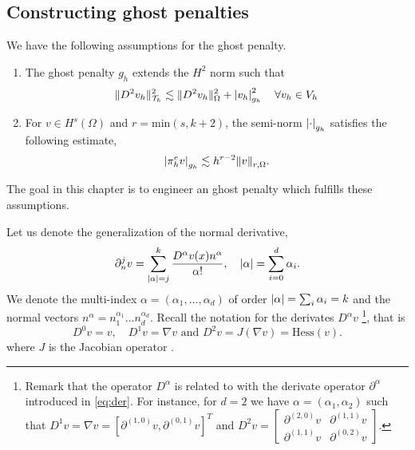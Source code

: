 
\subsection{Constructing ghost penalties}%
\label{sec:constructing_ghost_penalties}

We have the following assumptions for the ghost penalty.
\begin{enumerate}[label=\textbf{EP\arabic*}]
    \item \label{as:EP1} The ghost penalty $g_{h}$ extends the $H^{2}$ norm such that
        \begin{equation}
    \| D^2v_{h} \|_{ \mathcal{T} _{h} }^{ 2 }  \lesssim \| D^2 v_{h} \|_{ \Omega  }^{  2} + \left\lvert  v_{h}  \right\rvert _{g_{h}}^2 \quad \forall v_{h} \in V_{h}
        \end{equation}
\item \label{as:EP2} For $v \in H^{s}( \Omega ) $ and $r = \mathrm{ min} (s,k+2) $, the semi-norm $\left\lvert  \cdot   \right\rvert_{g_{h}} $ satisfies the following estimate, \[
    \left\lvert  \pi _{h}^{e} v  \right\rvert _{g_{h}} \lesssim  h^{r-2} \| v \|_{ r,\Omega  }^{  }.
    \]
\end{enumerate}
The goal in this chapter is to engineer an ghost penalty which fulfills these assumptions.

Let us denote the generalization of the normal derivative,
\begin{equation}
\partial _{n}^{j} v = \sum_{\left\lvert  \alpha   \right\rvert =j }^{k} \frac{D ^{\alpha }v( x) n^{\alpha }}{\alpha !}, \quad \left\lvert  \alpha   \right\rvert = \sum_{i=0}^{d} \alpha_{i}.
\end{equation}
We denote the multi-index $\alpha  = ( \alpha _{1}, \ldots, \alpha _{d})  $ of order $\left\lvert  \alpha   \right\rvert = \sum_{i}^{}  \alpha _{i} = k $   and the normal vectors $n^{\alpha } = n_{1}^{\alpha _{1}} \ldots n_{d}^{\alpha _{d}}$.
Recall the notation for the derivates $D^{\alpha } v$
\footnote{
Remark that the operator $D^{\alpha }$  is related to with the derivate operator $\partial ^{\alpha } $ introduced in \eqref{eq:der}. For instance, for $d=2$ we have $\alpha = ( \alpha _{1}, \alpha _{2}) $  such that $ D^{1} v =  \nabla v  = \left[ \partial ^{( 1,0 )} v,\partial ^{( 0,1 )}v
\right]^{T}$ and $   D^2 v  = \begin{bmatrix}
\partial ^{( 2,0 )} v &  \partial ^{( 1,1) }v \\
\partial ^{( 1,1 )} v &  \partial ^{( 0,2) }v
\end{bmatrix}
 $.
},
that is
\begin{equation}
D ^{0} v  = v, \quad   D ^{1}v  = \nabla v \text{ and }  D ^{2} v  = J(\nabla v) = \mathrm{Hess}(v).
\end{equation}
where $J$ is the Jacobian operator .

